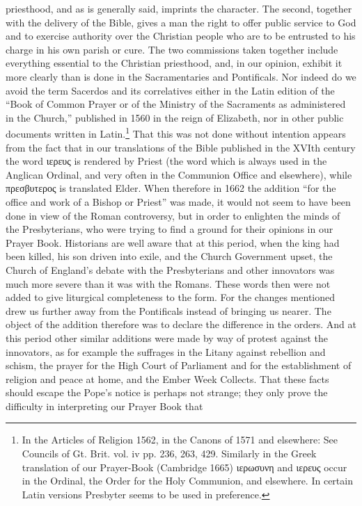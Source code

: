 priesthood, and as is generally said, imprints the character. The second, together with the delivery of the Bible, gives a man the right to offer public service to God and to exercise authority over the Christian people who are to be entrusted to his charge in his own parish or cure. The two commissions taken together include everything essential to the Christian priesthood, and, in our opinion, exhibit it more clearly than is done in the Sacramentaries and Pontificals. Nor indeed do we avoid the term Sacerdos and its correlatives either in the Latin edition of the “Book of Common Prayer or of the Ministry of the Sacraments as administered in the Church,” published in 1560 in the reign of Elizabeth, nor in other public documents written in Latin.\footnote{In the Articles of Religion 1562, in the Canons of 1571 and elsewhere: See Councils of Gt. Brit. vol. iv pp. 236, 263, 429. Similarly in the Greek translation of our Prayer-Book (Cambridge 1665) ιερωσυνη and ιερευς occur in the Ordinal, the Order for the Holy Communion, and elsewhere. In certain Latin versions Presbyter seems to be used in preference.} That this was not done without intention appears from the fact that in our translations of the Bible published in the XVIth century the word \textgreek{ιερευς }is rendered by Priest (the word which is always used in the Anglican Ordinal, and very often in the Communion Office and elsewhere), while \textgreek{πρεσβυτερος }is translated Elder. When therefore in 1662 the addition “for the office and work of a Bishop or Priest” was made, it would not seem to have been done in view of the Roman controversy, but in order to enlighten the minds of the Presbyterians, who were trying to find a ground for their opinions in our Prayer Book. Historians are well aware that at this period, when the king had been killed, his son driven into exile, and the Church Government upset, the Church of England’s debate with the Presbyterians and other innovators was much more severe than it was with the Romans. These words then were not added to give liturgical completeness to the form. For the changes mentioned drew us further away from the Pontificals instead of bringing us nearer. The object of the addition therefore was to declare the difference in the orders. And at this period other similar additions were made by way of protest against the innovators, as for example the suffrages in the Litany against rebellion and schism, the prayer for the High Court of Parliament and for the establishment of religion and peace at home, and the Ember Week Collects. That these facts should escape the Pope’s notice is perhaps not strange; they only prove the difficulty in interpreting our Prayer Book that

